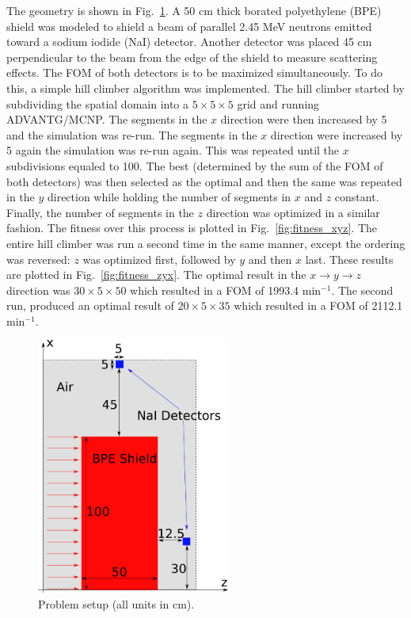 \documentclass[conference]{IEEEtran}
\begin{document}
\pagebreak
\appendix
The geometry is shown in Fig.~\ref{fig:probsetup}. A 50 cm thick borated polyethylene (BPE) shield was modeled to shield a beam of parallel 2.45 MeV neutrons emitted toward a sodium iodide (NaI) detector. Another detector was placed 45 cm perpendicular to the beam from the edge of the shield to measure scattering effects. The FOM of both detectors is to be maximized simultaneously. To do this, a simple hill climber algorithm was implemented. The hill climber started by subdividing the spatial domain into a $5 \times 5 \times 5$ grid and running ADVANTG/MCNP. The segments in the $x$ direction were then increased by 5 and the simulation was re-run. The segments in the $x$ direction were increased by 5 again the simulation was re-run again. This was repeated until the $x$ subdivisions equaled to 100. The best (determined by the sum of the FOM of both detectors) was then selected as the optimal and then the same was repeated in the $y$ direction while holding the number of segments in $x$ and $z$ constant. Finally, the number of segments in the $z$ direction was optimized in a similar fashion. The fitness over this process is plotted in Fig.~\ref{fig:fitness_xyz}. The entire hill climber was run a second time in the same manner, except the ordering was reversed: $z$ was optimized first, followed by $y$ and then $x$ last. These results are plotted in Fig.~\ref{fig:fitness_zyx}. The optimal result in the $x \rightarrow y \rightarrow z$ direction was $30 \times 5 \times 50$ which resulted in a FOM of 1993.4 min$^{-1}$. The second run, produced an optimal result of $20 \times 5 \times 35$ which resulted in a FOM of 2112.1 min$^{-1}$.
\begin{figure}[!t]
  \centering
  \includegraphics[width=2.5in]{probsetup}
  \caption{Problem setup (all units in cm).}
  \label{fig:probsetup}
\end{figure}
\end{document}
